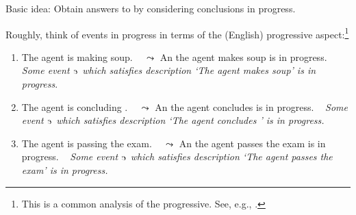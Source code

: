 \documentclass[10pt]{article}
\begin{document}
\begin{note}
  Basic idea: Obtain answers to \qWhy{} by considering conclusions in progress.
\end{note}

\begin{comment}
  Part of why this is interesting.
  Maybe.
  No subjunctives, with the exception of thinking about events in progress.
  If you can do events in progress without subjunctives, then, things go through.
  Even projections.
  These talk about possibility, and entail various subjunctives, but that's about it.
\end{comment}

\begin{note}
  \hfill\hspace{\dimexpr-\fboxrule-\fboxsep\relax}\hfill
\end{note}

\begin{note}
  Roughly, think of events in progress in terms of the (English) progressive aspect:\footnote{
    This is a common analysis of the progressive.
    See, e.g., \cite{Bennett:1972uw,Dowty:1979vq,Parsons:1990aa,Landman:1992wh,Portner:1998um}.
  }
  \begin{enumerate}
  \item
    The agent is making soup.%
    \mbox{ } \hfill \(\leadsto\) An  the agent makes soup is in progress.\newline
    \mbox{ }\hfill \emph{{\color{gray} Some event \(\eXdn{}\) which satisfies description} {\color{darkgray} `The agent makes soup'} {\color{gray} is in progress}}.
  \item
    The agent is concluding \rootsCon{}.%
    \mbox{ } \hfill \(\leadsto\) An  the agent concludes \rootsCon{} is in progress.\newline
    \mbox{ }\hfill \emph{{\color{gray} Some event \(\eXdn{}\) which satisfies description} {\color{darkgray} `The agent concludes \rootsCon{}' } {\color{gray} is in progress}.}
  \item
    The agent is passing the exam.%
    \mbox{ } \hfill \(\leadsto\) An  the agent passes the exam is in progress.\newline
    \mbox{ }\hfill \emph{{\color{gray} Some event \(\eXdn{}\) which satisfies description} {\color{darkgray} `The agent passes the exam'} {\color{gray} is in progress}.}
  \end{enumerate}
\begin{comment}
  This doesn't quite work, as the progressive has some quirks.
  Still, it's close enough to fix a grasp on events in progress.
\end{comment}
\end{note}
\end{document}
